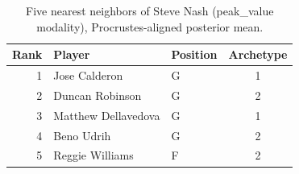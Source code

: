 \begin{table}[htbp]
  \centering\small
  \begin{tabular}{rllc}
    \toprule
    Rank & Player & Position & Archetype \\
    \midrule
    1 & Jose Calderon & G & 1 \\
    2 & Duncan Robinson & G & 2 \\
    3 & Matthew Dellavedova & G & 1 \\
    4 & Beno Udrih & G & 2 \\
    5 & Reggie Williams & F & 2 \\
    \bottomrule
  \end{tabular}
  \caption{Five nearest neighbors of Steve Nash (peak_value modality), Procrustes-aligned posterior mean.}
  \label{tab:Steve_Nash_neighbors_peak_value}
\end{table}

